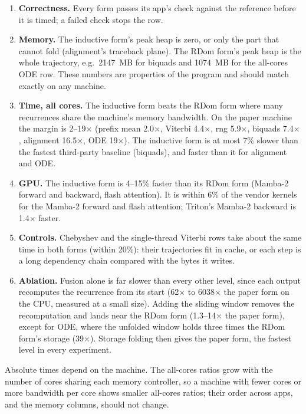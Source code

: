 \begin{enumerate}
  \item \textbf{Correctness.} Every form passes its app's check against the
    reference before it is timed; a failed check stops the row.
  \item \textbf{Memory.} The inductive form's peak heap is zero, or only the
    part that cannot fold (alignment's traceback plane). The RDom form's peak
    heap is the whole trajectory, e.g.\ 2147~MB for biquads and 1074~MB for
    the all-cores ODE row. These numbers are properties of the program and
    should match exactly on any machine.
  \item \textbf{Time, all cores.} The inductive form beats the RDom form where
    many recurrences share the machine's memory bandwidth. On the paper
    machine the margin is 2--19$\times$ (prefix mean 2.0$\times$, Viterbi
    4.4$\times$, rng 5.9$\times$, biquads 7.4$\times$, alignment
    16.5$\times$, ODE 19$\times$). The inductive form is at most 7\% slower
    than the fastest third-party baseline (biquads), and faster than it for
    alignment and ODE.
  \item \textbf{GPU.} The inductive form is 4--15\% faster than its RDom
    form (Mamba-2 forward and backward, flash attention). It is within 6\% of
    the vendor kernels for the Mamba-2 forward and flash attention; Triton's
    Mamba-2 backward is 1.4$\times$ faster.
  \item \textbf{Controls.} Chebyshev and the single-thread Viterbi rows take
    about the same time in both forms (within 20\%): their trajectories fit in
    cache, or each step is a long dependency chain compared with the bytes it
    writes.
  \item \textbf{Ablation.} Fusion alone is far slower than every other level,
    since each output recomputes the recurrence from its start (62$\times$ to
    6038$\times$ the paper form on the CPU, measured at a small size).
    Adding the sliding window removes the recomputation and lands near the
    RDom form (1.3--14$\times$ the paper form), except for ODE, where the
    unfolded window holds three times the RDom form's storage (39$\times$).
    Storage folding then gives the paper form, the fastest level in every
    experiment.
\end{enumerate}

Absolute times depend on the machine. The all-cores ratios grow with the
number of cores sharing each memory controller, so a machine with fewer cores
or more bandwidth per core shows smaller all-cores ratios; their order across
apps, and the memory columns, should not change.

